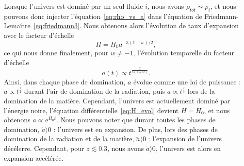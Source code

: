 \documentclass[11pt, twoside, a4paper, openright]{report}
\begin{document}
Lorsque l'univers est dominé par un seul fluide $i$, nous avons $\rho_{tot} \sim \rho_{i}$, et nous pouvons donc injecter l'équation~\ref{eq:rho_vs_a} dans l'équation de Friedmann-Lemaître~\ref{eq:friedmann3}. Nous obtenons alors l'évolution de taux d'expansion avec le facteur d'échelle
\begin{equation}
  \label{eq:H_evol}
  H = H_0 a^{-3 (1+w) / 2} ,
\end{equation}
ce qui nous donne finalement, pour $w \neq -1$, l'évolution temporelle du facteur d'échelle
\begin{equation}
  \label{eq:a_vs_t}
  a(t) \propto t^{\frac{2}{3(1+w)}} .
\end{equation}
Ainsi, dans chaque phase de domination, $a$ évolue comme une loi de puissance : $a \propto t^{\frac{1}{2}}$ durant l'air de domination de la radiation, puis $a \propto t^{\frac{2}{3}}$ lors de la domination de la matière. Cependant, l'univers est actuellement dominé par l'énergie noire, l'équation différentielle~\ref{eq:H_evol} devient $H = H_0$, et nous obtenons $a \propto \mathrm{e}^{H_{0} t}$. Nous pouvons noter que durant toutes les phases de domination, $\dot a \rangle 0$ : l'univers est en expansion. De plus, lors des phases de domination de la radiation et de la matière, $\ddot a \langle 0$ : l'expansion de l'univers décélerre. Cependant, pour $ z \lesssim 0.3$, nous avons $\ddot a \rangle 0$, l'univers est alors en expansion accélérée.


\end{document}
